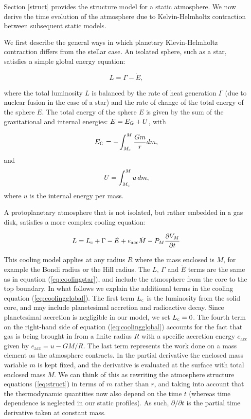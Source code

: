 \documentclass[apj]{emulateapj}
\newcommand{\co}{_{\rm c}}
\begin{document}
Section \ref{struct} provides the structure model for a static atmosphere. We now derive the time evolution of the atmosphere due to Kelvin-Helmholtz contraction between subsequent static models. 

We first describe the general ways in which planetary Klevin-Helmholtz contraction differs from the stellar case. An isolated sphere, such as a star, satisfies a simple global energy equation:

\begin{equation}
\label{eq:coolingstar}
L=\Gamma - \dot{E},
\end{equation}

\noindent where the total luminosity $L$ is balanced by the rate of heat generation $\Gamma$ (due to nuclear fusion in the case of a star) and the rate of change of the total energy of the sphere $\dot{E}$. The total energy of the sphere $E$ is given by the sum of the gravitational and internal energies: $E=E_{\rm G}+U$, with 

\begin{equation}
\label{eq:Eg}
E_{\rm G}=-\int_{M\co}^M \frac{G m}{r} dm,
\end{equation}
and
\begin{equation}
\label{eq:U}
U=\int_{M\co}^M u\, dm,
\end{equation}
where $u$ is the internal energy per mass.

A protoplanetary atmosphere that is not isolated, but rather embedded in a gas disk, satisfies a more complex cooling equation:

\begin{equation}
\label{eq:coolingglobal}
L=L\co+\Gamma-\dot{E}+e_{\mathrm{acc}}\dot{M}-P_M \frac{\partial V_M}{\partial t}
\end{equation}

This cooling model applies at any radius $R$ where the mass enclosed is $M$, for example the Bondi radius or the Hill radius. The $L$, $\Gamma$ and $\dot{E}$ terms are the same as in equation (\ref{eq:coolingstar}), and include the atmosphere from the core to the top boundary. In what follows we explain the additional terms in the cooling equation (\ref{eq:coolingglobal}). The first term $L\co$ is the luminosity from the solid core, and may include planetesimal accretion and radioactive decay. Since planetesimal accretion is negligible in our model, we set $L\co=0$. The fourth term on the right-hand side of equation (\ref{eq:coolingglobal}) accounts for the fact that gas is being brought in from a finite radius $R$ with a specific accretion energy $e_{\mathrm{acc}}$ given by $e_{\mathrm{acc}}=u-G M/R$. The last term represents the work done on a mass element as the atmosphere contracts. In the partial derivative the enclosed mass variable $m$ is kept fixed, and the derivative is evaluated at the surface with total enclosed mass $M$. We can think of this as rewriting the atmosphere structure equations (\ref{eq:struct}) in terms of $m$ rather than $r$, and taking into account that the thermodynamic quantities now also depend on the time $t$ (whereas time dependence is neglected in our static profiles). As such, $\partial / \partial t$ is the partial time derivative taken at constant mass. 
\end{document}
